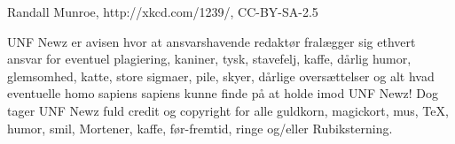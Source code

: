 \begin{minipage}[b]{0.95\linewidth}
\begin{minipage}[t]{0.47\textwidth}
\end{minipage}

\begin{center}
\tiny Randall Munroe, http://xkcd.com/1239/, CC-BY-SA-2.5

\tiny UNF Newz er avisen hvor at ansvarshavende redaktør fralægger sig ethvert ansvar for eventuel plagiering, kaniner, tysk, stavefelj, kaffe, dårlig humor, glemsomhed, katte, store sigmaer, pile, skyer, dårlige oversættelser og alt hvad eventuelle homo sapiens sapiens kunne finde på at holde imod UNF Newz! Dog tager UNF Newz fuld credit og copyright for alle guldkorn, magickort, mus, \TeX, humor, smil, Mortener, kaffe, før-fremtid, ringe og/eller Rubiksterning.
\end{center}
\end{minipage}

